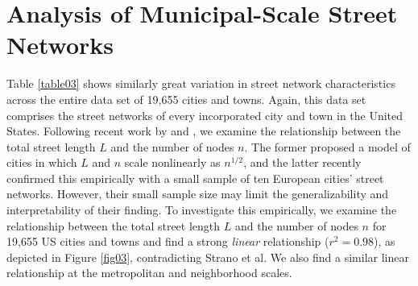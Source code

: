 \documentclass{article}
\begin{document}
\section{Analysis of Municipal-Scale Street Networks}

Table \ref{table03} shows similarly great variation in street network characteristics across the entire data set of 19,655 cities and towns. Again, this data set comprises the street networks of every incorporated city and town in the United States. Following recent work by \citet{barthelemy_modeling_2008} and \citet{strano_urban_2013}, we examine the relationship between the total street length $L$ and the number of nodes $n$. The former proposed a model of cities in which $L$ and $n$ scale nonlinearly as $n^{1/2}$, and the latter recently confirmed this empirically with a small sample of ten European cities' street networks. However, their small sample size may limit the generalizability and interpretability of their finding. To investigate this empirically, we examine the relationship between the total street length $L$ and the number of nodes $n$ for 19,655 US cities and towns and find a strong \emph{linear} relationship ($r^{2}=0.98$), as depicted in Figure \ref{fig03}, contradicting Strano et al. We also find a similar linear relationship at the metropolitan and neighborhood scales.
\end{document}
